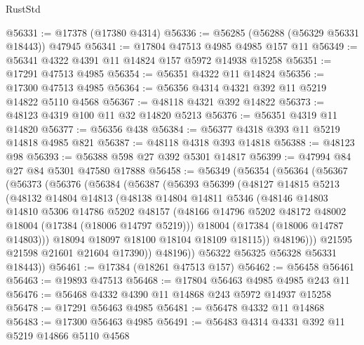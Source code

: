 \begin{lexlean}{RustStd}
\begin{coremodule}
@56331 := @17378 (@17380 @4314)
@56336 := @56285 (@56288 (@56329 @56331 @18443)) @47945
@56341 := @17804 @47513 @4985 @4985 @157 @11
@56349 := @56341 @4322 @4391 @11 @14824 @157 @5972 @14938 @15258
@56351 := @17291 @47513 @4985
@56354 := @56351 @4322 @11 @14824
@56356 := @17300 @47513 @4985
@56364 := @56356 @4314 @4321 @392 @11 @5219 @14822 @5110 @4568
@56367 := @48118 @4321 @392 @14822
@56373 := @48123 @4319 @100 @11 @32 @14820 @5213
@56376 := @56351 @4319 @11 @14820
@56377 := @56356 @438
@56384 := @56377 @4318 @393 @11 @5219 @14818 @4985 @821
@56387 := @48118 @4318 @393 @14818
@56388 := @48123 @98
@56393 := @56388 @598 @27 @392 @5301 @14817
@56399 := @47994 @84 @27 @84 @5301 @47580 @17888
@56458 := @56349
    (@56354
      (@56364
        (@56367
          (@56373
            (@56376
              (@56384
                (@56387
                  (@56393
                    @56399
                    (@48127
                      @14815
                      @5213
                      (@48132
                        @14804
                        @14813
                        (@48138
                          @14804
                          @14811
                          @5346
                          (@48146
                            @14803
                            @14810
                            @5306
                            @14786
                            @5202
                            @48157
                            (@48166
                              @14796
                              @5202
                              @48172
                              @48002
                              @18004
                              (@17384 (@18006 @14797 @5219)))
                            @18004
                            (@17384 (@18006 @14787 @14803)))
                          @18094
                          @18097
                          @18100
                          @18104
                          @18109
                          @18115))
                      @48196)))
                @21595
                @21598
                @21601
                @21604
                @17390))
            @48196))
        @56322
        @56325
        @56328
        @56331
        @18443))
@56461 := @17384 (@18261 @47513 @157)
@56462 := @56458 @56461
@56463 := @19893 @47513
@56468 := @17804 @56463 @4985 @4985 @243 @11
@56476 := @56468 @4332 @4390 @11 @14868 @243 @5972 @14937 @15258
@56478 := @17291 @56463 @4985
@56481 := @56478 @4332 @11 @14868
@56483 := @17300 @56463 @4985
@56491 := @56483 @4314 @4331 @392 @11 @5219 @14866 @5110 @4568

\end{coremodule}
\end{lexlean}

